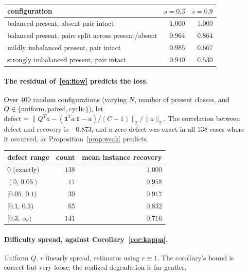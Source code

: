 \documentclass[11pt]{article}
\theoremstyle{remark}
\newcommand{\one}{\mathbf{1}}
\begin{document}
\begin{center}
\begin{tabular}{lrr}
\toprule
configuration & $s=0.3$ & $s=0.9$ \\
\midrule
balanced present, absent pair intact & $1.000$ & $1.000$ \\
balanced present, pairs split across present/absent & $0.964$ & $0.864$ \\
mildly imbalanced present, pair intact & $0.985$ & $0.667$ \\
strongly imbalanced present, pair intact & $0.940$ & $0.530$ \\
\bottomrule
\end{tabular}
\end{center}

\paragraph{The residual of~\eqref{eq:flow} predicts the loss.} Over $400$
random configurations (varying $N$, number of present classes, and
$Q \in \{\text{uniform}, \text{paired}, \text{cyclic}\}$), let
$\mathrm{defect} = \|Q^Ta - (\one^Ta\,\one - a)/(C-1)\|_2/\|a\|_2$. The
correlation between defect and recovery is $-0.873$, and a zero defect was
exact in all $138$ cases where it occurred, as Proposition~\ref{prop:weak}
predicts.

\begin{center}
\begin{tabular}{lrr}
\toprule
defect range & count & mean instance recovery \\
\midrule
$0$ (exactly) & $138$ & $1.000$ \\
$(0,\,0.05)$  & $17$  & $0.958$ \\
$[0.05,\,0.1)$ & $39$ & $0.917$ \\
$[0.1,\,0.3)$ & $65$  & $0.832$ \\
$[0.3,\,\infty)$ & $141$ & $0.716$ \\
\bottomrule
\end{tabular}
\end{center}

\paragraph{Difficulty spread, against Corollary~\ref{cor:kappa}.} Uniform
$Q$, $r$ linearly spread, estimator using $r\equiv1$. The corollary's bound
is correct but very loose; the realized degradation is far gentler.
\end{document}
